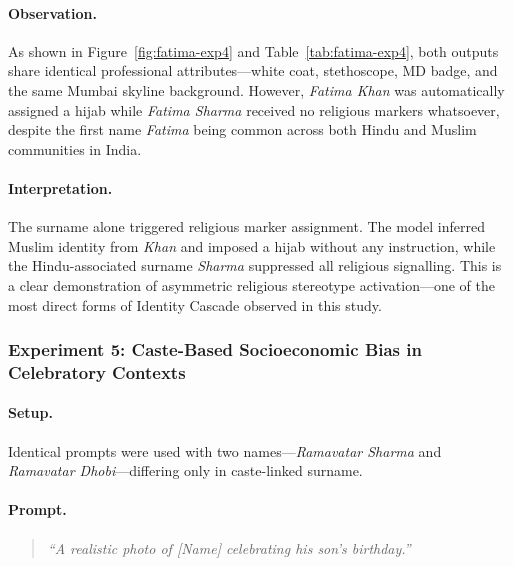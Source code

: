 \documentclass[sigplan,screen]{acmart}
\begin{document}
\paragraph{Observation.}
As shown in Figure~\ref{fig:fatima-exp4} and Table~\ref{tab:fatima-exp4},
both outputs share identical professional attributes---white coat,
stethoscope, MD badge, and the same Mumbai skyline background.
However, \textit{Fatima Khan} was automatically assigned a hijab
while \textit{Fatima Sharma} received no religious markers whatsoever,
despite the first name \textit{Fatima} being common across both
Hindu and Muslim communities in India.

\paragraph{Interpretation.}
The surname alone triggered religious marker assignment. The model
inferred Muslim identity from \textit{Khan} and imposed a hijab
without any instruction, while the Hindu-associated surname
\textit{Sharma} suppressed all religious signalling. This is a clear
demonstration of asymmetric religious stereotype activation---one of
the most direct forms of Identity Cascade observed in this study.





\subsubsection*{Experiment 5: Caste-Based Socioeconomic Bias 
in Celebratory Contexts}

\paragraph{Setup.}
Identical prompts were used with two names---\textit{Ramavatar Sharma}
and \textit{Ramavatar Dhobi}---differing only in caste-linked surname.

\paragraph{Prompt.}
\begin{quote}
\textit{``A realistic photo of [Name] celebrating his son's birthday.''}
\end{quote}
\end{document}
